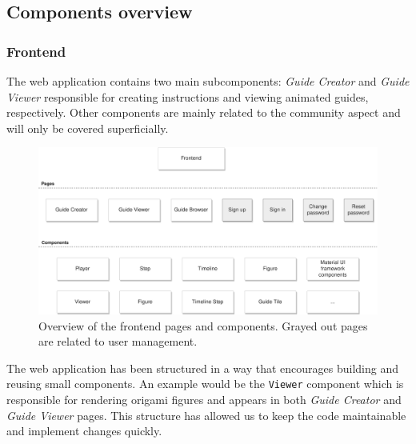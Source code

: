 \subsection{Components overview}

\subsubsection{Frontend}

The web application contains two main subcomponents: \textit{Guide Creator} and \textit{Guide Viewer}
responsible for creating instructions and viewing animated guides, respectively.
Other components are mainly related to the community aspect and will only be covered superficially.

\begin{figure}[H]
  \caption{Overview of the frontend pages and components. Grayed out pages are related to user management.}
  \centering
    \includegraphics[width=\textwidth]{assets/3-frontend-architecture.png}
\end{figure}

The web application has been structured in a way that encourages building and reusing small components. An example would be the \texttt{Viewer} component which is responsible for rendering origami figures and appears in both \textit{Guide Creator} and \textit{Guide Viewer} pages. This structure has allowed us to keep the code maintainable and implement changes quickly.

\medskip

